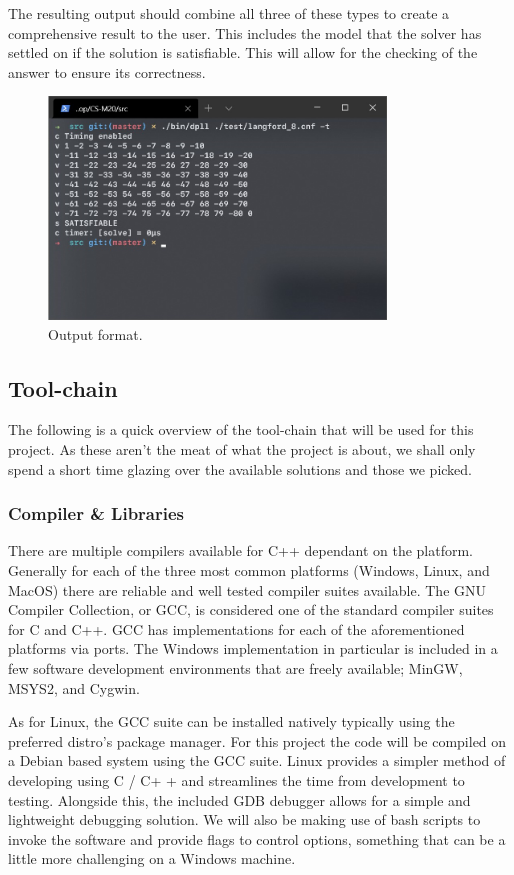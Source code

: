 \documentclass{article}
\begin{document}
The resulting output should combine all three of these types to create a comprehensive result to the
user. This includes the model that the solver has settled on if the solution is satisfiable. This
will allow for the checking of the answer to ensure its correctness.

\begin{figure}[h]
    \centering
    \includegraphics[width=0.8\textwidth]{output_example.jpg}
    \caption{Output format.}
\end{figure}

\subsection{Tool-chain}
The following is a quick overview of the tool-chain that will be used for this project. As these aren't the meat of what the
project is about, we shall only spend a short time glazing over the available solutions and those we picked.

\subsubsection{Compiler \& Libraries}
There are multiple compilers available for C++ dependant on the platform. Generally for each of the three most common platforms
(Windows, Linux, and MacOS) there are reliable and well tested compiler suites available. The GNU Compiler Collection, or GCC, is
considered one of the standard compiler suites for C and C++. GCC has implementations for each of the aforementioned platforms
via ports. The Windows implementation in particular is included in a few software development environments that are freely
available; MinGW, MSYS2, and Cygwin.

As for Linux, the GCC suite can be installed natively typically using the preferred distro's package manager. For this project the
code will be compiled on a Debian based system using the GCC suite. Linux provides a simpler method of developing using C / C+
+ and streamlines the time from development to testing. Alongside this, the included GDB debugger allows for a simple and
lightweight debugging solution. We will also be making use of bash scripts to invoke the software and provide flags to control
options, something that can be a little more challenging on a Windows machine.
\end{document}
